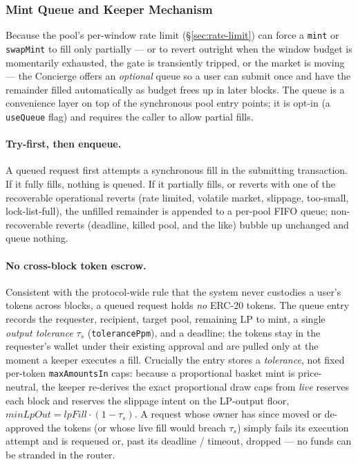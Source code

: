 \documentclass[11pt]{article}
\begin{document}
\subsubsection{Mint Queue and Keeper Mechanism}
\label{sec:mint-queue}

Because the pool's per-window rate limit (\S\ref{sec:rate-limit}) can
force a \texttt{mint} or \texttt{swapMint} to fill only partially --- or
to revert outright when the window budget is momentarily exhausted, the
gate is transiently tripped, or the market is moving --- the Concierge
offers an \emph{optional} queue so a user can submit once and have the
remainder filled automatically as budget frees up in later blocks. The
queue is a convenience layer on top of the synchronous pool entry
points; it is opt-in (a \texttt{useQueue} flag) and requires the caller
to allow partial fills.

\paragraph{Try-first, then enqueue.} A queued request first attempts a
synchronous fill in the submitting transaction. If it fully fills,
nothing is queued. If it partially fills, or reverts with one of the
recoverable operational reverts (rate limited, volatile market,
slippage, too-small, lock-list-full), the unfilled remainder is appended
to a per-pool FIFO queue; non-recoverable reverts (deadline, killed
pool, and the like) bubble up unchanged and queue nothing.

\paragraph{No cross-block token escrow.} Consistent with the
protocol-wide rule that the system never custodies a user's tokens
across blocks, a queued request holds \emph{no} ERC-20 tokens. The
queue entry records the requester, recipient, target pool, remaining LP
to mint, a single \emph{output tolerance} $\tau_s$
(\texttt{tolerancePpm}), and a deadline; the tokens stay in the
requester's wallet under their existing approval and are pulled only at
the moment a keeper executes a fill. Crucially the entry stores a
\emph{tolerance}, not fixed per-token \texttt{maxAmountsIn} caps:
because a proportional basket mint is price-neutral, the keeper
re-derives the exact proportional draw caps from \emph{live} reserves
each block and reserves the slippage intent on the LP-output floor,
$\mathit{minLpOut} = \mathit{lpFill}\cdot(1 - \tau_s)$. A request whose
owner has since moved or de-approved the tokens (or whose live fill
would breach $\tau_s$) simply fails its execution attempt and is
requeued or, past its deadline / timeout, dropped --- no funds can be
stranded in the router.
\end{document}
